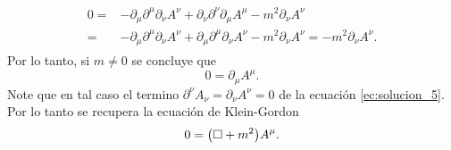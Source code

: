 \documentclass{article}
\begin{document}
\begin{enumerate}[1)]
\begin{align}
\begin{split}
0=&-\partial_\mu\partial^\mu\partial_\nu A^\nu+\partial_\nu\partial^\nu\partial_\mu A^\mu-m^2\partial_\nu A^\nu\\
=&-\partial_\mu\partial^\mu\partial_\nu A^\nu+\partial_\mu\partial^\mu\partial_\nu A^\nu-m^2\partial_\nu A^\nu=-m^2\partial_\nu A^\nu.
\end{split}
\end{align}
Por lo tanto, si $m\neq 0$ se concluye que
\begin{equation}
0=\partial_\mu A^\mu.
\end{equation}
Note que en tal caso el termino $\partial^\nu A_\nu=\partial_\nu A^\nu=0$ de la ecuación \eqref{ec:solucion_5}. Por lo tanto se recupera la ecuación de Klein-Gordon
\begin{equation}
0=\qty(\Box+m^2)A^\mu.
\end{equation}

\end{enumerate}
\end{document}
